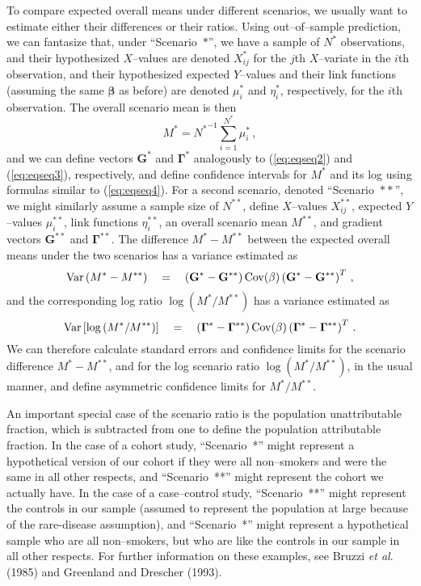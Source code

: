 \documentclass{article}      %
\begin{document}
To compare expected overall means under different scenarios, we usually want to estimate either their differences
or their ratios. Using out--of--sample prediction, we can fantasize that, under ``Scenario~$*$'', we have a sample of $N^*$
observations, and their hypothesized $X$--values are denoted $X^*_{ij}$ for the $j$th $X$--variate in the $i$th observation,
and their hypothesized expected $Y$--values and their link functions (assuming the same $\mathbf{\beta}$ as before) are denoted
$\mu^*_i$ and $\eta^*_i$, respectively, for the $i$th observation. The overall scenario mean is then
\begin{equation}
M^* = {N^*}^{-1} \sum_{i=1}^{N^*} \mu^*_i \, ,
\label{eq:eqseq5}
\end{equation}
and we can define vectors $\mathbf{G^*}$ and $\mathbf{\Gamma^*}$ analogously to (\ref{eq:eqseq2}) and (\ref{eq:eqseq3}), respectively,
and define confidence intervals for $M^*$ and its log using formulas similar to (\ref{eq:eqseq4}).
For a second scenario, denoted ``Scenario~$**$'', we might similarly assume a sample size of $N^{**}$,
define $X$--values $X^{**}_{ij}$, expected $Y$--values $\mu^{**}_i$,
link functions $\eta^{**}_i$, an overall scenario mean $M^{**}$,
and gradient vectors $\mathbf{G^{**}}$ and $\mathbf{\Gamma^{**}}$.
The difference $M^*-M^{**}$ between the expected overall means under the two scenarios has a variance estimated as
\begin{equation}
\mathrm{Var} \left( M^*-M^{**} \right) \quad = \quad \left( \mathbf{G^*} - \mathbf{G^{**}} \right) \mathrm{Cov}(\mathbf{\beta}) \left( \mathbf{G^*} - \mathbf{G^{**}} \right)^T \, ,
\label{eq:eqseq6}
\end{equation}
and the corresponding log ratio $\log(M^*/M^{**})$ has a variance estimated as
\begin{equation}
\mathrm{Var} \left[\log\left( M^*/M^{**} \right)\right] \quad = \quad \left( \mathbf{\Gamma^*} - \mathbf{\Gamma^{**}} \right) \mathrm{Cov}(\mathbf{\beta}) \left( \mathbf{\Gamma^*} - \mathbf{\Gamma^{**}} \right)^T \, .
\label{eq:eqseq7}
\end{equation}
We can therefore calculate standard errors and confidence limits for the scenario difference $M^* - M^{**}$,
and for the log scenario ratio $\log(M^*/M^{**})$, in the usual manner, and define asymmetric confidence limits for
$M^*/M^{**}$.

An important special case of the scenario ratio is the population unattributable fraction,
which is subtracted from one to define the population attributable fraction.
In the case of a cohort study, ``Scenario~*'' might represent a hypothetical version of our cohort
if they were all non--smokers and were the same in all other respects,
and ``Scenario~**'' might represent the cohort we actually have.
In the case of a case--control study, ``Scenario~**'' might represent the controls in our sample
(assumed to represent the population at large because of the rare-disease assumption),
and ``Scenario~*'' might represent a hypothetical sample who are all non--smokers, but
who are like the controls in our sample in all other respects. For further information
on these examples, see Bruzzi \textit{et al}. (1985) and Greenland and Drescher (1993).
\end{document}
